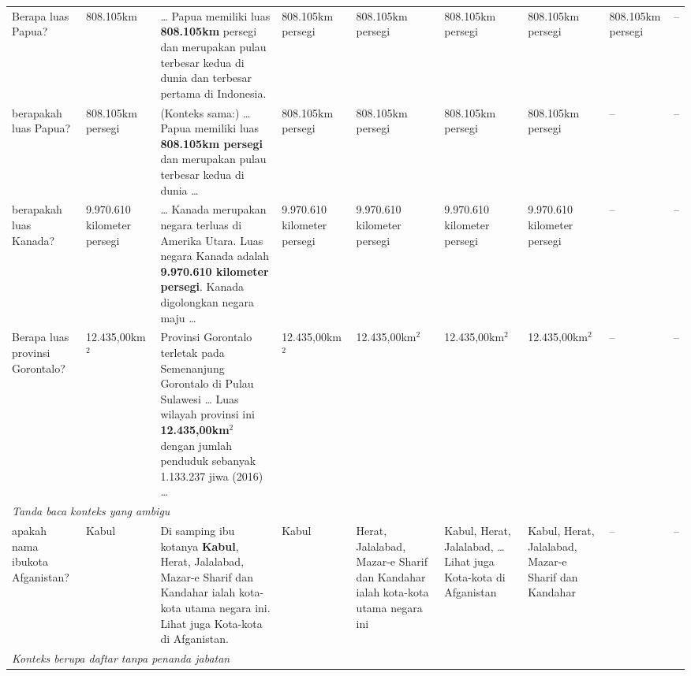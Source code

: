 \documentclass[11pt,a4paper]{article}
\begin{document}
\begin{landscape}
{\begin{longtable}{p{2.0cm}p{1.6cm}p{5.2cm}p{1.9cm}p{1.9cm}p{1.9cm}p{1.9cm}p{2.1cm}p{2.1cm}}
    Berapa luas Papua? & 808.105km
      & \ldots{} Papua memiliki luas \textbf{808.105km} persegi dan merupakan pulau terbesar kedua di dunia dan terbesar pertama di Indonesia.
      & \cellcolor{elong}808.105km persegi & \cellcolor{elong}808.105km persegi & \cellcolor{elong}808.105km persegi
      & \cellcolor{elong}808.105km persegi & \cellcolor{elong}808.105km persegi & -- \\
    berapakah luas Papua? & 808.105km persegi
      & (Konteks sama:) \ldots{} Papua memiliki luas \textbf{808.105km persegi} dan merupakan pulau terbesar kedua di dunia \ldots
      & \cellcolor{ecorrect}808.105km persegi & \cellcolor{ecorrect}808.105km persegi & \cellcolor{ecorrect}808.105km persegi
      & \cellcolor{ecorrect}808.105km persegi & -- & -- \\
    berapakah luas Kanada? & 9.970.610 kilometer persegi
      & \ldots{} Kanada merupakan negara terluas di Amerika Utara. Luas negara Kanada adalah \textbf{9.970.610 kilometer persegi}. Kanada digolongkan negara maju \ldots
      & \cellcolor{ecorrect}9.970.610 kilometer persegi & \cellcolor{ecorrect}9.970.610 kilometer persegi
      & \cellcolor{ecorrect}9.970.610 kilometer persegi & \cellcolor{ecorrect}9.970.610 kilometer persegi & -- & -- \\
    Berapa luas provinsi Gorontalo? & 12.435,00km$^2$
      & Provinsi Gorontalo terletak pada Semenanjung Gorontalo di Pulau Sulawesi \ldots{} Luas wilayah provinsi ini \textbf{12.435,00km$^2$} dengan jumlah penduduk sebanyak 1.133.237 jiwa (2016) \ldots
      & \cellcolor{ecorrect}12.435,00km$^2$ & \cellcolor{ecorrect}12.435,00km$^2$ & \cellcolor{ecorrect}12.435,00km$^2$
      & \cellcolor{ecorrect}12.435,00km$^2$ & -- & -- \\
    \midrule
    \multicolumn{9}{l}{\cellcolor{black!8}\textit{Tanda baca konteks yang ambigu}} \\*
    apakah nama ibukota Afganistan? & Kabul
      & Di samping ibu kotanya \textbf{Kabul}, Herat, Jalalabad, Mazar-e Sharif dan Kandahar ialah kota-kota utama negara ini. Lihat juga Kota-kota di Afganistan.
      & \cellcolor{ecorrect}Kabul
      & \cellcolor{ewspan}Herat, Jalalabad, Mazar-e Sharif dan Kandahar ialah kota-kota utama negara ini
      & \cellcolor{elong}Kabul, Herat, Jalalabad, \ldots{} Lihat juga Kota-kota di Afganistan
      & \cellcolor{elong}Kabul, Herat, Jalalabad, Mazar-e Sharif dan Kandahar & -- & -- \\
    \midrule
    \multicolumn{9}{l}{\cellcolor{black!8}\textit{Konteks berupa daftar tanpa penanda jabatan}} \\*

\end{longtable}}
\end{landscape}
\end{document}
